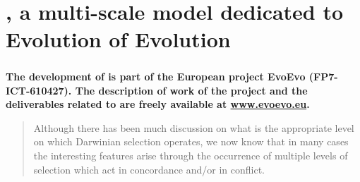 

\chapter{{\EvoEvoSim}, a multi-scale model dedicated to Evolution of Evolution}
\label{ch:part2:methodology}

\paragraph{}
\paragraph{}
\paragraph{}
\paragraph{}
\paragraph{}
\paragraph{}
\paragraph{}
\begin{center}
\large \textbf{The development of {\EvoEvoSim} is part of the European project EvoEvo (FP7-ICT-610427). The description of work of the project and the deliverables related to {\EvoEvoSim} are freely available at \href{www.evoevo.eu}{www.evoevo.eu}.}
\end{center}

\newpage


\begin{quote}
Although there has been much discussion on what is the appropriate level on which Darwinian selection operates, we now know that in many cases the interesting features arise through the occurrence of multiple levels of selection which act in concordance and/or in conflict.\\
\citep{hogeweg-and-takeuchi-2003}
\end{quote}


